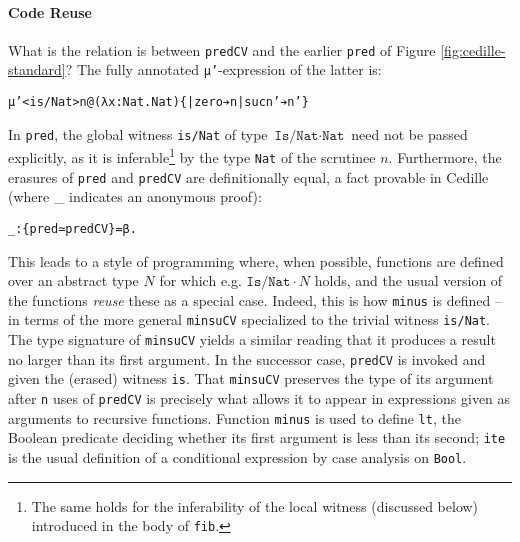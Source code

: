 \documentclass{article}
\begin{document}
\paragraph{\textbf{Code Reuse}}
What is the relation is between \texttt{predCV}
and the earlier \texttt{pred} of Figure \ref{fig:cedille-standard}? The fully
annotated \texttt{μ'}-expression of the latter is:
{
\begin{alltt}
μ'<is/Nat> n @(λ x: Nat. Nat) \{| zero ➔ n | suc n' ➔ n'\}
\end{alltt}
}
\noindent In \texttt{pred}, the global witness \texttt{is/Nat} of type
\(\texttt{Is/Nat} ·\texttt{Nat}\) need not be passed explicitly, as it is
inferable\footnote{The same holds for the inferability of the local witness
(discussed below) introduced in the body of \texttt{fib}.} by the type
\texttt{Nat} of the scrutinee $n$. Furthermore, the erasures of \texttt{pred}
and \texttt{predCV} are definitionally equal, a fact provable in Cedille (where
\_ indicates an anonymous proof):
{
\begin{alltt}
_ : \{pred ≃ predCV\} = β.
\end{alltt}
}

This leads to a style of programming where, when possible, functions are defined
over an abstract type $N$ for which e.g. \(\texttt{Is/Nat} ·N\) holds, and the
usual version of the functions \textit{reuse} these as a special case. Indeed, this is how
\texttt{minus} is defined -- in terms of the more general \texttt{minsuCV} specialized
to the trivial witness \texttt{is/Nat}. The type signature of \texttt{minsuCV}
yields a similar reading that it produces a result no
larger than its first argument. In the successor case, \texttt{predCV} is invoked
and given the (erased) witness \texttt{is}. That \texttt{minsuCV} preserves the
type of its argument after \texttt{n} uses of \texttt{predCV} is precisely what
allows it to appear in expressions given as arguments to recursive functions.
Function \texttt{minus} is used to define \texttt{lt}, the Boolean predicate
deciding whether its first argument is less than its second; \texttt{ite} is the
usual definition of a conditional expression by case analysis on \texttt{Bool}.
\end{document}
